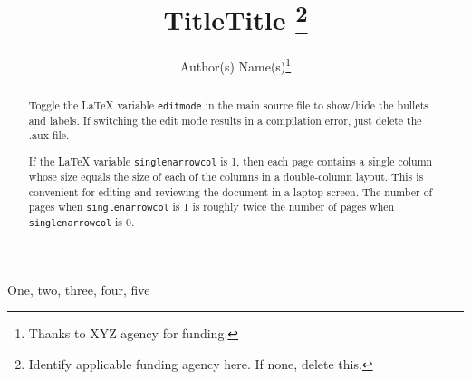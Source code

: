 \documentclass{article}
\begin{document}
\if{}
    \title{Title}
    \address{Author Affiliation(s)}
\else
    \title{Title
        \thanks{Identify applicable funding agency here. If none, delete this.}}


    \author{Author(s) Name(s)\thanks{Thanks to XYZ agency for funding.}}
\fi

\maketitle


\begin{abstract}
    Toggle the LaTeX variable \texttt{editmode} in the main source file to
    show/hide the bullets and labels. If switching the edit mode results
    in a compilation error, just delete the .aux file.

    If the LaTeX variable \texttt{singlenarrowcol} is 1, then each page contains
    a single column whose size equals the size of each of the columns in a
    double-column layout. This is convenient for editing and reviewing the
    document in a laptop screen. The number of pages when
    \texttt{singlenarrowcol} is 1 is roughly twice the number of pages when
    \texttt{singlenarrowcol} is 0.

\end{abstract}

\if{}
    \begin{IEEEkeywords}
        One, two, three, four, five
    \end{IEEEkeywords}
\fi
\end{document}
